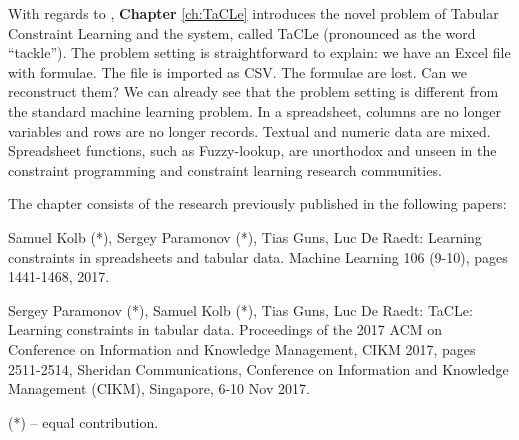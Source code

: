 With regards to \ctwo,  \textbf{Chapter} \ref{ch:TaCLe} introduces  the novel problem of
Tabular Constraint Learning and the system, called TaCLe (pronounced
as the word ``tackle''). The problem setting is straightforward to
explain: we have an Excel file with formulae. The file is imported as
CSV. The formulae are lost. Can we reconstruct them? We can already 
see that the problem setting is different from the standard machine
learning problem. In a spreadsheet, columns are no longer variables
and rows are no longer records. Textual and numeric data are mixed.
Spreadsheet functions, such as Fuzzy-lookup, are unorthodox and unseen in
the constraint programming and constraint learning research communities.

The chapter consists of the research previously published in the following papers:

\begin{addmargin}[2em]{2em}
Samuel Kolb (*), Sergey Paramonov (*), Tias Guns, Luc De Raedt:
  Learning constraints in spreadsheets and tabular data. Machine
  Learning 106 (9-10), pages 1441-1468, 2017.


Sergey Paramonov (*), Samuel Kolb (*), Tias Guns, Luc De Raedt:
TaCLe: Learning constraints in tabular data. 
 Proceedings of the 2017 ACM on Conference on Information and
    Knowledge Management, CIKM 2017, pages 2511-2514, Sheridan
    Communications, Conference on Information and Knowledge Management
    (CIKM), Singapore, 6-10 Nov 2017.

\pubrev
(*) -- equal contribution.
\pubrevend
\end{addmargin}





